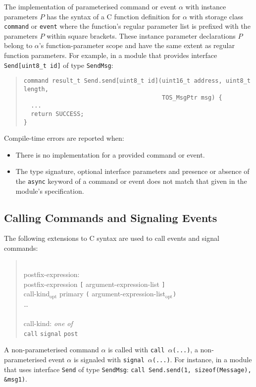 \documentclass[11pt,letterpaper]{article}
\newcommand{\kw}[1]{{\tt #1}}
\newcommand{\code}[1]{{\tt #1}}
\newcommand{\opt}{$_{\mbox{opt}}$\xspace}
\newcommand{\grammarshift}{\vspace*{-.7cm}}
\newcommand{\grammarindent}{\hspace*{2cm}\= \\ \kill}
\begin{document}
The implementation of parameterised command or event $\alpha$ with
instance parameters $P$ has the syntax of a C function definition for
$\alpha$ with storage class \kw{command} or \kw{event} where the
function's regular parameter list is prefixed with the parameters $P$
within square brackets. These instance parameter declarations
$P$ belong to $\alpha$'s function-parameter scope and have the same
extent as regular function parameters. For example, in a module that
provides interface \code{Send[uint8\_t id]} of type \kw{SendMsg}:
\begin{quote} \begin{verbatim}
command result_t Send.send[uint8_t id](uint16_t address, uint8_t length, 
                                       TOS_MsgPtr msg) {
  ...
  return SUCCESS;
}
\end{verbatim} \end{quote}

Compile-time errors are reported when:
\begin{itemize}
\item There is no implementation for a provided command or event.
\item The type signature, optional interface parameters and presence or
absence of the \kw{async} keyword of a command or event does not match that
given in the module's specification.
\end{itemize}

\subsection{Calling Commands and Signaling Events}

The following extensions to C syntax are used to call events and signal
commands:
\begin{quote} \grammarshift \em \begin{tabbing}
\grammarindent
postfix-expression:\\
\>	postfix-expression \kw{[} argument-expression-list \kw{]}\\
\>	call-kind\opt primary \kw{(} argument-expression-list\opt \kw{)}\\
\>	\ldots
\\\\
call-kind: \emph{one of}\\
\>	\kw{call} \kw{signal} \kw{post}
\end{tabbing} \end{quote}

A non-parameterised command $\alpha$ is called with \code{call
$\alpha$(...)}, a non-parameterised event $\alpha$ is signaled with
\code{signal $\alpha$(...)}. For instance, in a module that uses interface
\code{Send} of type \kw{SendMsg}: \code{call Send.send(1, sizeof(Message),
\&msg1)}.
\end{document}
